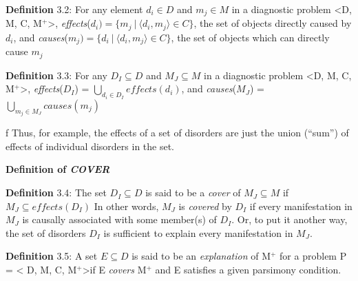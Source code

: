 \documentclass{article}
\begin{document}
\par 
\textbf{Definition} 3.2: For any element $d_i \in D$ and $m_j \in M$ in a
diagnostic problem \textless D, M, C, M$^{+}$\textgreater,
\textit{effects}($d_i) = \{ m_j\:|\:\langle d_i, m_j\rangle \in C\}$, the set
of objects directly caused by $d_i$, and 
\textit{causes}($m_j) = \{ d_i\:|\:\langle d_i, m_j\rangle \in C\}$, the set of
objects which can directly cause $m_j$
\newline


\par 
\textbf{Definition} 3.3: For any $D_I \subseteq D$ and $M_J \subseteq M$ in a
diagnostic problem \textless D, M, C, M$^{+}$\textgreater,
\textit{effects}($D_I$) = $\bigcup\limits_{d_i \in D_I} effects(d_i)$, and
\textit{causes}($M_J$) = $\bigcup\limits_{m_j \in M_J} causes(m_j)$
\newline
\par f
Thus, for example, the effects of a set of disorders are just the union
(``sum'') of effects of individual disorders in the set.
\newline


\textbf{Definition of \textit{COVER}}
\newline
\par 
\textbf{Definition} 3.4: The set $D_I \subseteq D$ is said to be a
\textit{cover} of $M_J \subseteq M$ if $M_J \subseteq effects(D_I)$
\newline
In other words, $M_J$ is \textit{covered} by $D_I$ if every manifestation in
$M_J$ is causally associated with some member(s) of $D_I$.  Or, to put it
another way, the set of disorders $D_I$ is sufficient to explain every 
manifestation in $M_J$.


\par 
\textbf{Definition} 3.5: A set $E \subseteq D$ is said to be an
\textit{explanation} of M$^{+}$ for a problem P = \textless
D, M, C, M$^{+}$\textgreater if E \textit{covers} M$^{+}$ and E satisfies a
given parsimony condition.
\newline
\end{document}
